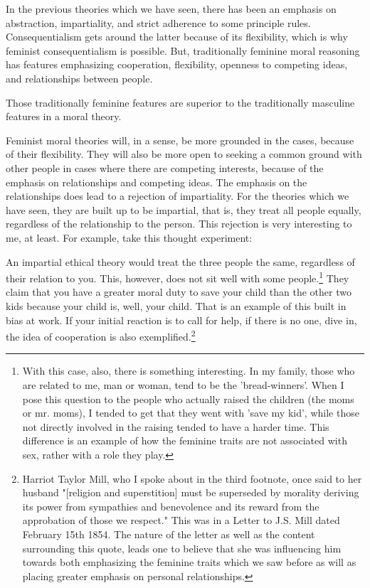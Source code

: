 In the previous theories which we have seen, there has been an emphasis on abstraction, impartiality, and strict adherence to some principle rules. Consequentialism gets around the latter because of its flexibility, which is why feminist consequentialism is possible. But, traditionally feminine moral reasoning has features emphasizing cooperation, flexibility, openness to competing ideas, and relationships between people.
\begin{center}
Those traditionally feminine features are superior to the traditionally masculine features in a moral theory.
\end{center}
Feminist moral theories will, in a sense, be more grounded in the cases, because of their flexibility. They will also be more open to seeking a common ground with other people in cases where there are competing interests, because of the emphasis on relationships and competing ideas. The emphasis on the relationships does lead to a rejection of impartiality. For the theories which we have seen, they are built up to be impartial, that is, they treat all people equally, regardless of the relationship to the person. This rejection is very interesting to me, at least. For example, take this thought experiment:

An impartial ethical theory would treat the three people the same, regardless of their relation to you. This, however, does not sit well with some people.\footnote{With this case, also, there is something interesting. In my family, those who are related to me, man or woman, tend to be the 'bread-winners'. When I pose this question to the people who actually raised the children (the moms or mr. moms), I tended to get that they went with 'save my kid', while those not directly involved in the raising tended to have a harder time. This difference is an example of how the feminine traits are not associated with sex, rather with a role they play.} They claim that you have a greater moral duty to save your child than the other two kids because your child is, well, your child. That is an example of this built in bias at work. If your initial reaction is to call for help, if there is no one, dive in, the idea of cooperation is also exemplified.\footnote{Harriot Taylor Mill, who I spoke about in the third footnote, once said to her husband "[religion and superstition] must be superseded
by morality deriving its power from sympathies and benevolence and its reward from the approbation of those we respect."  This was in a Letter to J.S. Mill dated February 15th 1854. The nature of the letter as well as the content surrounding this quote, leads one to believe that she was influencing him towards both emphasizing the feminine traits which we saw before as will as placing greater emphasis on personal relationships.\autocite{Hayek1}}

